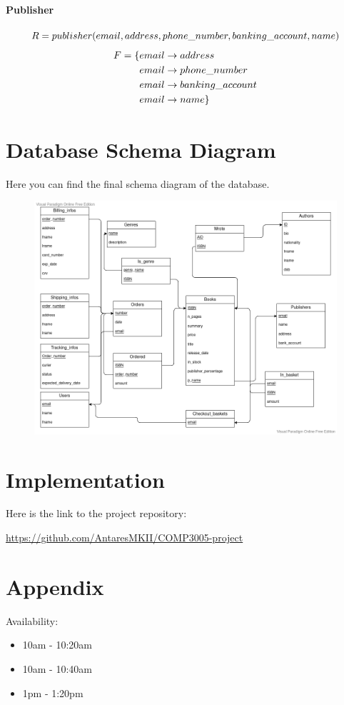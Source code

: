 \documentclass[fleqn]{scrreprt}
\begin{document}
\subsubsection{Publisher}
\begin{equation*}
    R = publisher(e\-mail, address, phone\_number, banking\_account, name)
\end{equation*}
\begin{align*}
    F = \{ & e\-mail \rightarrow address\\
           & e\-mail \rightarrow phone\_number\\
           & e\-mail \rightarrow banking\_account\\
           & e\-mail \rightarrow name\}
\end{align*}

\chapter{Database Schema Diagram}
Here you can find the final schema diagram of the database.
\begin{figure}[h]\centering
    \includegraphics[width=\columnwidth]{database-schema-diagram.vpd.png}
    \label{fig:dsd}
\end{figure}

\chapter{Implementation}
Here is the link to the project repository:

\url{https://github.com/AntaresMKII/COMP3005-project}

\chapter{Appendix}
Availability:
\begin{itemize}
    \item 10am - 10:20am
    \item 10am - 10:40am
    \item 1pm - 1:20pm
\end{itemize}
\end{document}
